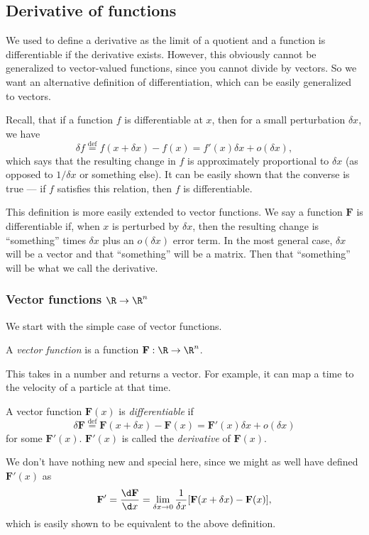 \documentclass[a4paper]{article}
\begin{document}
\subsection{Derivative of functions}
We used to define a derivative as the limit of a quotient and a function is differentiable if the derivative exists. However, this obviously cannot be generalized to vector-valued functions, since you cannot divide by vectors. So we want an alternative definition of differentiation, which can be easily generalized to vectors.

Recall, that if a function $f$ is differentiable at $x$, then for a small perturbation $\delta x$, we have
\[
  \delta f \stackrel{\text{def}}{=} f(x + \delta x) - f(x) = f'(x) \delta x + o(\delta x),
\]
which says that the resulting change in $f$ is approximately proportional to $\delta x$ (as opposed to $1/\delta x$ or something else). It can be easily shown that the converse is true --- if $f$ satisfies this relation, then $f$ is differentiable.

This definition is more easily extended to vector functions. We say a function $\mathbf{F}$ is differentiable if, when $x$ is perturbed by $\delta x$, then the resulting change is ``something'' times $\delta x$ plus an $o(\delta x)$ error term. In the most general case, $\delta x$ will be a vector and that ``something'' will be a matrix. Then that ``something'' will be what we call the derivative.

\subsubsection*{Vector functions \texorpdfstring{$\R \to \R^n$}{R to Rn}}
We start with the simple case of vector functions.
\begin{defi}
  A \emph{vector function} is a function $\mathbf{F}: \R\to \R^n$.
\end{defi}
This takes in a number and returns a vector. For example, it can map a time to the velocity of a particle at that time.

\begin{defi}
  A vector function $\mathbf{F}(x)$ is \emph{differentiable} if
  \[
    \delta \mathbf{F} \stackrel{\text{def}}{=}\mathbf{F}(x + \delta x)- \mathbf{F}(x) = \mathbf{F}'(x)\delta x + o(\delta x)
  \]
  for some $\mathbf{F}'(x)$. $\mathbf{F}'(x)$ is called the \emph{derivative} of $\mathbf{F}(x)$.
\end{defi}
We don't have nothing new and special here, since we might as well have defined $\mathbf{F}'(x)$ as
\[
  \mathbf{F}' = \frac{\d \mathbf{F}}{\d x} = \lim_{\delta x \to 0} \frac{1}{\delta x}[\mathbf{F}(x + \delta x) - \mathbf{F}(x)],
\]
which is easily shown to be equivalent to the above definition.
\end{document}
